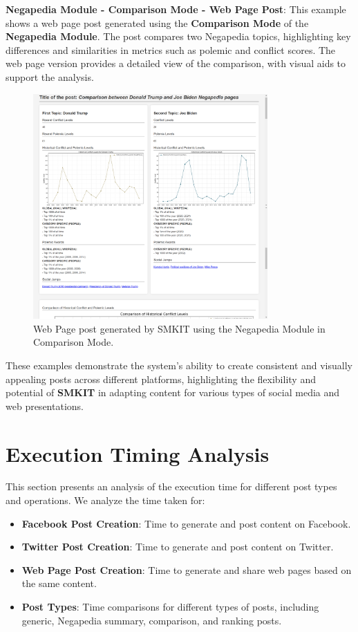 \textbf{Negapedia Module - Comparison Mode - Web Page Post}:  
This example shows a web page post generated using the \textbf{Comparison Mode} of the \textbf{Negapedia Module}. The post compares two Negapedia topics, highlighting key differences and similarities in metrics such as polemic and conflict scores. The web page version provides a detailed view of the comparison, with visual aids to support the analysis.

\begin{figure}[H]
    \centering
    \includegraphics[width=0.8\textwidth]{figures/results/negapedia_module/comparison_mode/web_page/web_page_negapedia_comparison_post_screenshot.png}
    \caption{Web Page post generated by SMKIT using the Negapedia Module in Comparison Mode.}
    \label{fig:web_page_negapedia_comparison_post_screenshot}
\end{figure}

These examples demonstrate the system’s ability to create consistent and visually appealing posts across different platforms, highlighting the flexibility and potential of \textbf{SMKIT} in adapting content for various types of social media and web presentations.


\section{Execution Timing Analysis}
\label{sec:execution_timing}
This section presents an analysis of the execution time for different post types and operations. We analyze the time taken for:
\begin{itemize}
    \item \textbf{Facebook Post Creation}: Time to generate and post content on Facebook.
    \item \textbf{Twitter Post Creation}: Time to generate and post content on Twitter.
    \item \textbf{Web Page Post Creation}: Time to generate and share web pages based on the same content.
    \item \textbf{Post Types}: Time comparisons for different types of posts, including generic, Negapedia summary, comparison, and ranking posts.
\end{itemize}


